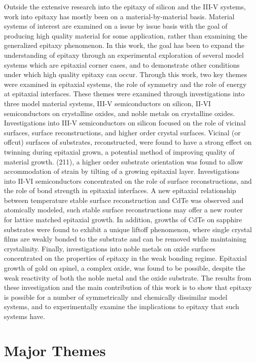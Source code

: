 Outside the extensive research into the epitaxy of silicon and the III-V systems, work into epitaxy has mostly been on a material-by-material basis.
Material systems of interest are examined on a issue by issue basis with the goal of producing high quality material for some application, rather than examining the generalized epitaxy phenomenon.
In this work, the goal has been to expand the understanding of epitaxy through an experimental exploration of several model systems which are epitaxial corner cases, and to demonstrate other conditions under which high quality epitaxy can occur.
Through this work, two key themes were examined in epitaxial systems, the role of symmetry and the role of energy at epitaxial interfaces.
These themes were examined through investigations into three model material systems, III-V semiconductors on silicon, II-VI semiconductors on crystalline oxides, and noble metals on crystalline oxides.
Investigations into III-V semiconductors on silicon focused on the role of vicinal surfaces, surface reconstructions, and higher order crystal surfaces. Vicinal (or offcut) surfaces of substrates, reconstructed, were found to have a strong effect on twinning during epitaxial grown, a potential method of improving quality of material growth. (211), a higher order substrate orientation was found to allow accommodation of strain by tilting of a growing epitaxial layer.
Investigations into II-VI semiconductors concentrated on the role of surface reconstructions, and the role of bond strength in epitaxial interfaces. A new epitaxial relationship between temperature stable surface reconstruction and CdTe was observed and atomically modeled, such stable surface reconstructions may offer a new router for lattice matched epitaxial growth. In addition, growths of CdTe on sapphire substrates were found to exhibit a unique liftoff phenomenon, where single crystal films are weakly bonded to the substrate and can be removed while maintaining crystalinity.
Finally, investigations into noble metals on oxide surfaces concentrated on the properties of epitaxy in the weak bonding regime. Epitaxial growth of gold on spinel, a complex oxide, was found to be possible, despite the weak reactivity of both the noble metal and the oxide substrate.
The results from these investigation and the main contribution of this work is to show that epitaxy is possible for a number of symmetrically and chemically dissimilar model systems, and to experimentally examine the implications to epitaxy that such systems have.

\section{Major Themes}
